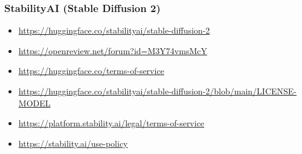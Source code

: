 \subsubsection{StabilityAI (Stable Diffusion 2)}
\begin{itemize}
    \item \url{https://huggingface.co/stabilityai/stable-diffusion-2}
    \item \url{https://openreview.net/forum?id=M3Y74vmsMcY}
    \item \url{https://huggingface.co/terms-of-service}
    \item \url{https://huggingface.co/stabilityai/stable-diffusion-2/blob/main/LICENSE-MODEL}
    \item \url{https://platform.stability.ai/legal/terms-of-service}
    \item \url{https://stability.ai/use-policy}
\end{itemize}
\clearpage